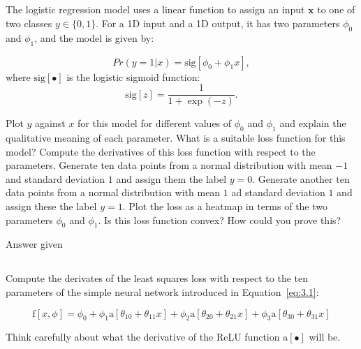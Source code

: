 \documentclass[12pt]{report}
\begin{document}
\subsection{}
\begin{mdframed}
    The logistic regression model uses a linear function to assign an input $\mathbf{x}$ to one of two classes $y \in \{0,1\}$. For a 1D input and a 1D output, it has two parameters $\phi_{0}$ and $\phi_{1}$, and the model is given by:

    \begin{equation*}
        Pr(y=1|x) = \text{sig}[\phi_{0} + \phi_{1}x],
    \end{equation*}
    where $\text{sig}[\bullet]$ is the logistic sigmoid function:
    \begin{equation*}
        \text{sig}[z] = \frac{1}{1 + \exp(-z)}.
    \end{equation*}

    Plot $y$ against $x$ for this model for different values of $\phi_{0}$ and $\phi_{1}$ and explain the qualitative meaning of each parameter. What is a suitable loss function for this model? Compute the derivatives of this loss function with respect to the parameters. Generate ten data points from a normal distribution with mean $-1$ and standard deviation $1$ and assign them the label $y=0$. Generate another ten data points from a normal distribution with mean $1$ ad standard deviation $1$ and assign these the label $y=1$. Plot the loss as a heatmap in terms of the two parameters $\phi_{0}$ and $\phi_{1}$. Is this loss function convex? How could you prove this?
\end{mdframed}

Answer given

\subsection{}
\begin{mdframed}
    Compute the derivates of the least squares loss with respect to the ten parameters of the simple neural network introduced in Equation~\ref{eq:3.1}:

    \begin{equation*}
        \text{f}[x,\phi] = \phi_{0} + \phi_{1}\text{a}[\theta_{10} + \theta_{11}x] + \phi_{2}\text{a}[\theta_{20} + \theta_{21}x] + \phi_{3}\text{a}[\theta_{30} + \theta_{31}x]
        \tag{3.1}
        \label{eq:3.1}
    \end{equation*}

    Think carefully about what the derivative of the ReLU function $\text{a}[\bullet]$ will be.
\end{mdframed}
\end{document}
